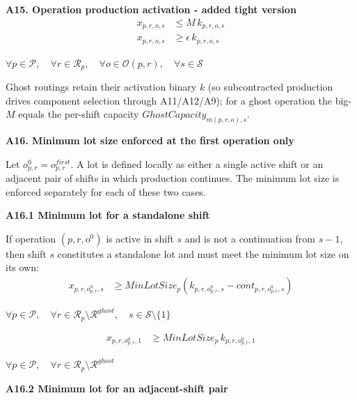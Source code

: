 \documentclass{article}
\begin{document}
\noindent\textbf{A15. Operation production activation - added tight version}
\begin{align}
x_{p,r,o,s} &\le M \, k_{p,r,o,s} \label{eq:A15_operation_activation_up} \\
x_{p,r,o,s} &\ge \epsilon \, k_{p,r,o,s} \label{eq:A15_operation_activation_low}
\end{align}
\begin{center}
$\forall p \in \mathcal{P}, \quad
\forall r \in \mathcal{R}_p, \quad
\forall o \in \mathcal{O}(p,r), \quad
\forall s \in \mathcal{S}$
\end{center}

Ghost routings retain their activation binary $k$ (so subcontracted production drives component selection through A11/A12/A9); for a ghost operation the big-$M$ equals the per-shift capacity $GhostCapacity_{m(p,r,o),s}$.

\noindent\textbf{A16. Minimum lot size enforced at the first operation only}

Let $o^0_{p,r}=o^{first}_{p,r}$. A lot is defined locally as either a single active shift or an adjacent pair of shifts in which production continues. The minimum lot size is enforced separately for each of these two cases.

\noindent\textbf{A16.1 Minimum lot for a standalone shift}

If operation $(p,r,o^0)$ is active in shift $s$ and is not a continuation from $s-1$, then shift $s$ constitutes a standalone lot and must meet the minimum lot size on its own:
\begin{align}
x_{p,r,o^0_{p,r},s}
&\ge
MinLotSize_p
\left(
k_{p,r,o^0_{p,r},s}
-
cont_{p,r,o^0_{p,r},s}
\right)
\label{eq:A16_min_lot_single}
\end{align}
\begin{center}
$\forall p \in \mathcal{P}, \quad
\forall r \in \mathcal{R}_p \setminus \mathcal{R}^{ghost}, \quad
s \in \mathcal{S}\setminus\{1\}$
\end{center}

\begin{align}
x_{p,r,o^0_{p,r},1}
&\ge
MinLotSize_p \,
k_{p,r,o^0_{p,r},1}
\label{eq:A16_min_lot_single_first}
\end{align}
\begin{center}
$\forall p \in \mathcal{P}, \quad
\forall r \in \mathcal{R}_p \setminus \mathcal{R}^{ghost}$
\end{center}

\noindent\textbf{A16.2 Minimum lot for an adjacent-shift pair}
\end{document}

